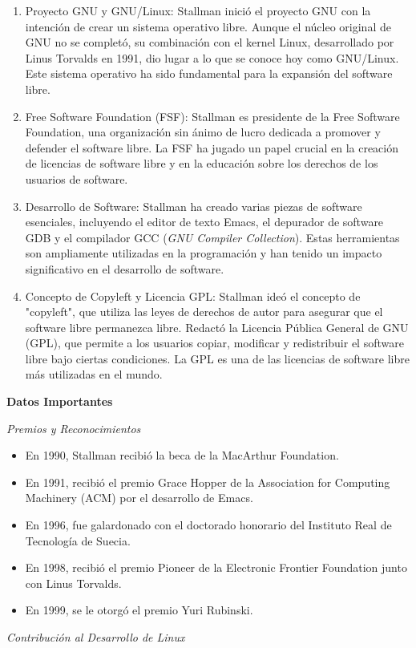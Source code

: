 \documentclass[11pt,twoside]{book}
\begin{document}
\begin{enumerate}
  \item Proyecto GNU y GNU/Linux: Stallman inició el proyecto GNU con la intención de crear un sistema operativo libre. Aunque el núcleo original de GNU no se completó, su combinación con el kernel Linux, desarrollado por Linus Torvalds en 1991, dio lugar a lo que se conoce hoy como GNU/Linux. Este sistema operativo ha sido fundamental para la expansión del software libre.

  \item Free Software Foundation (FSF): Stallman es presidente de la Free Software Foundation, una organización sin ánimo de lucro dedicada a promover y defender el software libre. La FSF ha jugado un papel crucial en la creación de licencias de software libre y en la educación sobre los derechos de los usuarios de software.

  \item Desarrollo de Software: Stallman ha creado varias piezas de software esenciales, incluyendo el editor de texto Emacs, el depurador de software GDB y el compilador GCC (\textit{GNU Compiler Collection}). Estas herramientas son ampliamente utilizadas en la programación y han tenido un impacto significativo en el desarrollo de software.

  \item Concepto de Copyleft y Licencia GPL: Stallman ideó el concepto de "copyleft", que utiliza las leyes de derechos de autor para asegurar que el software libre permanezca libre. Redactó la Licencia Pública General de GNU (GPL), que permite a los usuarios copiar, modificar y redistribuir el software libre bajo ciertas condiciones. La GPL es una de las licencias de software libre más utilizadas en el mundo.
\end{enumerate}

\textbf{Datos Importantes}

\textit{Premios y Reconocimientos}
\begin{itemize}

  \item En 1990, Stallman recibió la beca de la MacArthur Foundation.
  \item En 1991, recibió el premio Grace Hopper de la Association for Computing Machinery (ACM) por el desarrollo de Emacs.
  \item En 1996, fue galardonado con el doctorado honorario del Instituto Real de Tecnología de Suecia.
  \item En 1998, recibió el premio Pioneer de la Electronic Frontier Foundation junto con Linus Torvalds.
  \item En 1999, se le otorgó el premio Yuri Rubinski.
\end{itemize}
\textit{Contribución al Desarrollo de Linux}
\end{document}
